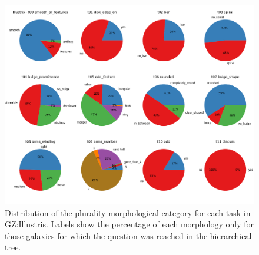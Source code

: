 \documentclass[iop,apj,tighten]{emulateapj}
\begin{document}
\begin{figure}
\centering
\includegraphics[width=160mm]{../plots/pie_illustris.png}
\caption{Distribution of the plurality morphological category for each task in GZ:Illustris. Labels show the percentage of each morphology only for those galaxies for which the question was reached in the hierarchical tree.\label{fig:piechart}}
\end{figure}


\acknowledgments{
}



\end{document}
